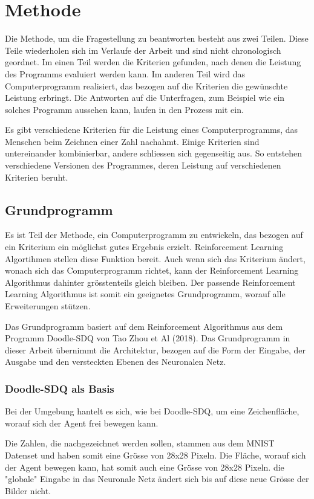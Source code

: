 \chapter{Methode}
Die Methode, um die Fragestellung zu beantworten besteht aus zwei Teilen. Diese
Teile wiederholen sich im Verlaufe der Arbeit und sind nicht chronologisch
geordnet. Im einen Teil werden die Kriterien gefunden, nach denen die Leistung
des Programms evaluiert werden kann. Im anderen Teil wird das Computerprogramm
realisiert, das bezogen auf die Kriterien die gewünschte Leistung erbringt. Die
Antworten auf die Unterfragen, zum Beispiel wie ein solches Programm aussehen
kann, laufen in den Prozess mit ein. 

Es gibt verschiedene Kriterien für die Leistung eines Computerprogramms, das
Menschen beim Zeichnen einer Zahl nachahmt. Einige Kriterien sind untereinander
kombinierbar, andere schliessen sich gegenseitig aus. So entstehen verschiedene
Versionen des Programmes, deren Leistung auf verschiedenen Kriterien beruht.


\section{Grundprogramm}
Es ist Teil der Methode, ein Computerprogramm zu entwickeln, das bezogen auf ein
Kriterium ein möglichst gutes Ergebnis erzielt. Reinforcement Learning
Algortihmen stellen diese Funktion bereit. Auch wenn sich das Kriterium ändert,
wonach sich das Computerprogramm richtet, kann der Reinforcement Learning
Algorithmus dahinter grösstenteils gleich bleiben. Der passende Reinforcement
Learning Algorithmus ist somit ein geeignetes Grundprogramm, worauf alle
Erweiterungen stützen.

Das Grundprogramm basiert auf dem Reinforcement Algorithmus aus dem Programm
Doodle-SDQ von Tao Zhou et Al (2018). Das Grundprogramm in dieser Arbeit
übernimmt die Architektur, bezogen auf die Form der Eingabe, der Ausgabe und den
versteckten Ebenen des Neuronalen Netz. 

\subsection*{Doodle-SDQ als Basis}
Bei der Umgebung hantelt es sich, wie bei Doodle-SDQ, um eine Zeichenfläche,
worauf sich der Agent frei bewegen kann. 

Die Zahlen, die nachgezeichnet werden sollen, stammen aus dem MNIST Datenset und
haben somit eine Grösse von 28x28 Pixeln. Die Fläche, worauf sich der Agent
bewegen kann, hat somit auch eine Grösse von 28x28 Pixeln. die "globale" Eingabe
in das Neuronale Netz ändert sich bis auf diese neue Grösse der Bilder nicht.


